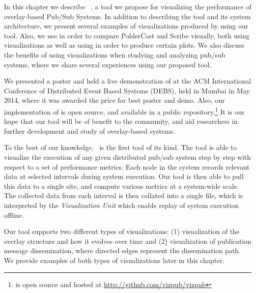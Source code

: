 In this chapter we describe \demo~\cite{korsveien2014vizpub}, a tool we
propose for visualizing the performance of overlay-based Pub/Sub
Systems. In addition to describing the tool and its system architecture,
we present several examples of visualizations produced by using our
tool. Also, we use \demo{} in order to compare PolderCast and Scribe
visually, both using visualizations as well as using \demo{} in order to
produce certain plots. We also discuss the benefits of using
visualizations when studying and analyzing pub/sub systems, where we
share several experiences using our proposed tool.

We presented a poster and held a live demonstration of \demo{} at the
ACM International Conference of Distributed Event Based Systems (DEBS),
held in Mumbai in May 2014, where it was awarded the price for best
poster and demo. Also, our implementation of \demo{} is open source, and
available in a public repository.\footnote{\demo{} is open source and
    hosted at \url{http://github.com/vizpub/vizpub}} It is our hope that
our tool will be of benefit to the community, and aid researchers in further
development and study of overlay-based systems.

To the best of our knowledge, \demo~is the first tool of its kind. The
tool is able to visualize the execution of any given distributed pub/sub
system step by step with respect to a set of performance metrics. Each
node in the system records relevant data at selected intervals during
system execution. Our tool is then able to pull this data to a single
site, and compute various metrics at a system-wide scale. The collected
data from each interval is then collated into a single \gexf{} file,
which is interpreted by the \emph{Visualization Unit} which enable
replay of system execution offline.

Our tool supports two different types of visualizations: (1) visualization of the
overlay structure and how it evolves over time and (2) visualization of
publication message dissemination, where directed edges represent the
dissemination path. We provide examples of both types of visualizations
later in this chapter.

